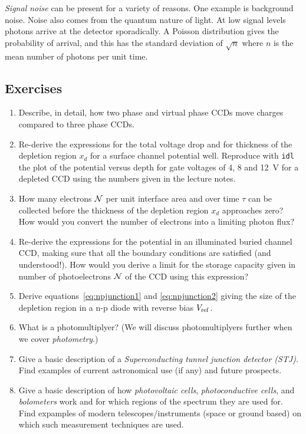{\it Signal noise} can be present for a variety of reasons. One example is
background noise. Noise also comes from the quantum nature of light. At
low signal levels photons arrive at the detector sporadically. A Poisson
distribution gives the probability of arrival, and this has the standard
deviation of $\sqrt{n}$ where $n$ is the mean number of photons per unit
time. 


\subsection{Exercises}

\begin{enumerate}
\item Describe, in detail, how two phase and virtual phase CCDs move charges
compared to three phase CCDs.
\item Re-derive the expressions for the total voltage drop and for thickness 
of the depletion region $x_d$ for a surface channel potential well. Reproduce
with {\tt idl} the plot of the potential versus depth for gate voltages of 
4, 8 and 12~V for a depleted CCD using the numbers given in the lecture notes.
\item How many electrons $\cal{N}$ per unit interface area and over time $\tau$
can be collected before the thickness of the depletion region $x_d$ 
approaches zero? How would you convert the number of electrons into a limiting
photon flux?
\item Re-derive the expressions for the potential in an illuminated buried
channel CCD, making sure that all the boundary conditions are satisfied (and 
understood!). How would you derive a limit for the storage capacity given 
in number of photoelectrons $\cal{N}$ of the CCD using this
expression?
\item Derive equations~\ref{eq:npjunction1} and \ref{eq:npjunction2}
  giving the size of the depletion region in a n-p diode with reverse
  bias $V_{\rm ref}$.
\item What is a photomultiplyer? (We will discuss photomultiplyers
  further when we cover {\it photometry}.)
\item Give a basic description of a {\it Superconducting tunnel
    junction detector (STJ)}. Find examples of current
  astronomical use (if any) and future prospects.
\item Give a basic description of how {\it photovoltaic cells}, 
{\it photoconductive cells}, and {\it bolometers} work and for which regions
of the spectrum they are used for. Find expamples of modern telescopes/instruments
(space or ground based) on which such measurement techniques are used.
\end{enumerate}

%
